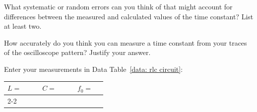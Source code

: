 \documentclass[addpoints]{physlabs}
\begin{document}
\begin{postlab}

    \filbreak
    \question[2] What systematic or random errors can you think of that might account for differences between the measured and calculated values of the time constant? List at least two.
    \begin{solution}[2cm]
        
    \end{solution}

    \filbreak
    \question[2] How accurately do you think you can measure a time constant from your traces of the oscilloscope pattern? Justify your answer.
    \begin{solution}[2cm]
        
    \end{solution}




    \filbreak
    \question[3] Enter your measurements in Data Table~\ref{data: rlc circuit}:

    \begin{center}
        \renewcommand{\arraystretch}{2}
        \begin{tabular}{lp{2cm}clp{2cm}clp{3cm}}
            $L=$ & & & $C=$ & & & $f_0=$ & 
            \\
            \cline{2-2}\cline{5-5}\cline{8-8}
        \end{tabular}
    \end{center}


\end{postlab}
\end{document}

